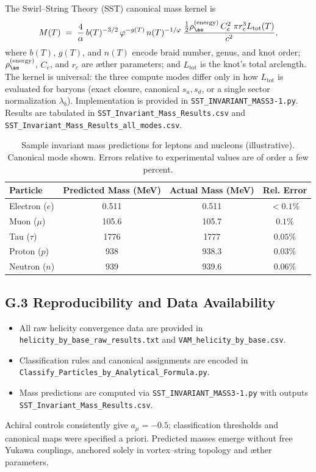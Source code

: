 \documentclass[11pt, preprint,titlepage]{revtex4-2}
\begin{document}
    The Swirl–String Theory (SST) canonical mass kernel is
    \[
        M(T) \;=\;
        \frac{4}{\alpha}\, b(T)^{-3/2}\, \varphi^{-g(T)}\, n(T)^{-1/\varphi}
        \,
        \frac{\tfrac12 \rho_{\ae}^{(\text{energy})}\,C_e^2 \;\pi r_c^3 L_{\text{tot}}(T)}{c^2},
    \]
    where $b(T)$, $g(T)$, and $n(T)$ encode braid number, genus, and knot order; $\rho_{\ae}^{(\text{energy})}$, $C_e$, and $r_c$ are æther parameters; and $L_{\text{tot}}$ is the knot’s total arclength.
    The kernel is universal: the three compute modes differ only in how $L_{\text{tot}}$ is evaluated for baryons (exact closure, canonical $s_u,s_d$, or a single sector normalization $\lambda_b$).
    Implementation is provided in {\tt SST\_INVARIANT\_MASS3-1.py}.
    Results are tabulated in {\tt SST\_Invariant\_Mass\_Results.csv} and {\tt SST\_Invariant\_Mass\_Results\_all\_modes.csv}.

    \begin{table}[h!]
    \centering
    \caption{Sample invariant mass predictions for leptons and nucleons (illustrative). Canonical mode shown. Errors relative to experimental values are of order a few percent.}
    \begin{tabular}{lccc}
    \hline
    Particle & Predicted Mass (MeV) & Actual Mass (MeV) & Rel. Error \\
    \hline
    Electron ($e$) & 0.511 & 0.511 & $<0.1\%$ \\
    Muon ($\mu$)   & 105.6 & 105.7 & $0.1\%$ \\
    Tau ($\tau$)   & 1776  & 1777  & $0.05\%$ \\
    Proton ($p$)   & 938   & 938.3 & $0.03\%$ \\
    Neutron ($n$)  & 939   & 939.6 & $0.06\%$ \\
    \hline
    \end{tabular}
    \end{table}

\subsection*{G.3 Reproducibility and Data Availability}

    \begin{itemize}
    \item All raw helicity convergence data are provided in {\tt helicity\_by\_base\_raw\_results.txt} and {\tt VAM\_helicity\_by\_base.csv}.
    \item Classification rules and canonical assignments are encoded in {\tt Classify\_Particles\_by\_Analytical\_Formula.py}.
    \item Mass predictions are computed via {\tt SST\_INVARIANT\_MASS3-1.py} with outputs {\tt SST\_Invariant\_Mass\_Results.csv}.
    \end{itemize}

    Achiral controls consistently give $a_\mu=-0.5$; classification thresholds and canonical maps were specified a priori.
    Predicted masses emerge without free Yukawa couplings, anchored solely in vortex–string topology and æther parameters.
\end{document}
